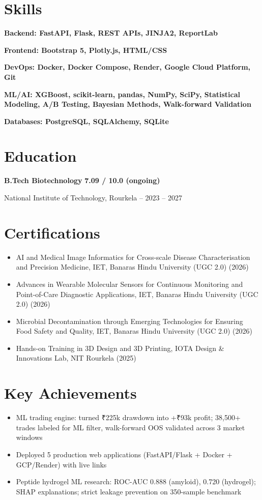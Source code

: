 \documentclass[11pt,a4paper]{article}
\begin{document}
\section*{Skills}
\noindent\textbf{Backend: FastAPI, Flask, REST APIs, JINJA2, ReportLab}

\noindent\textbf{Frontend: Bootstrap 5, Plotly.js, HTML/CSS}

\noindent\textbf{DevOps: Docker, Docker Compose, Render, Google Cloud Platform, Git}

\noindent\textbf{ML/AI: XGBoost, scikit-learn, pandas, NumPy, SciPy, Statistical Modeling, A/B Testing, Bayesian Methods, Walk-forward Validation}

\noindent\textbf{Databases: PostgreSQL, SQLAlchemy, SQLite}

\section*{Education}
\noindent\textbf{B.Tech Biotechnology} \hfill \textbf{7.09 / 10.0 (ongoing)}

\noindent National Institute of Technology, Rourkela -- 2023 – 2027

\section*{Certifications}
\begin{itemize}
    \item AI and Medical Image Informatics for Cross-scale Disease Characterisation and Precision Medicine, IET, Banaras Hindu University (UGC 2.0) (2026)
    \item Advances in Wearable Molecular Sensors for Continuous Monitoring and Point-of-Care Diagnostic Applications, IET, Banaras Hindu University (UGC 2.0) (2026)
    \item Microbial Decontamination through Emerging Technologies for Ensuring Food Safety and Quality, IET, Banaras Hindu University (UGC 2.0) (2026)
    \item Hands-on Training in 3D Design and 3D Printing, IOTA Design \& Innovations Lab, NIT Rourkela (2025)
\end{itemize}

\section*{Key Achievements}
\begin{itemize}
    \item ML trading engine: turned ₹225k drawdown into +₹93k profit; 38,500+ trades labeled for ML filter, walk-forward OOS validated across 3 market windows
    \item Deployed 5 production web applications (FastAPI/Flask + Docker + GCP/Render) with live links
    \item Peptide hydrogel ML research: ROC-AUC 0.888 (amyloid), 0.720 (hydrogel); SHAP explanations; strict leakage prevention on 350-sample benchmark
\end{itemize}
\end{document}
